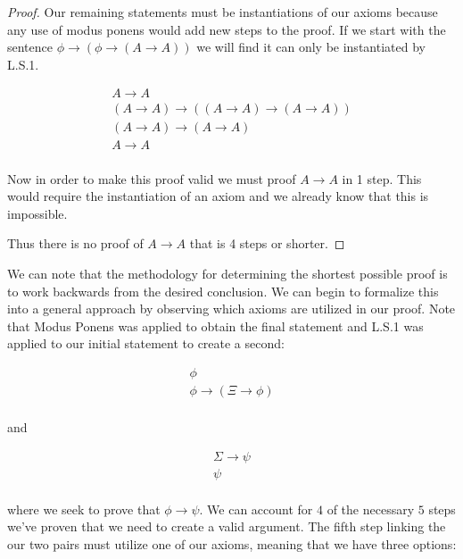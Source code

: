 \documentclass{article}
\begin{document}
\begin{proof}
Our remaining statements must be instantiations of our axioms because any use of modus ponens would add new steps to the proof.
If we start with the sentence $\phi \rightarrow (\phi \rightarrow (A \rightarrow A))$ we will find it can only be instantiated by L.S.1.

\begin{gather*}
A \rightarrow A \\
(A \rightarrow A) \rightarrow ((A \rightarrow A) \rightarrow (A \rightarrow A)) \tag*{L.S.1} \\
(A \rightarrow A) \rightarrow (A \rightarrow A) \tag*{Modus Ponenes} \\
A \rightarrow A \tag*{Modus Ponens}\\
\end{gather*}

Now in order to make this proof valid we must proof $A \rightarrow A$ in 1 step.
This would require the instantiation of an axiom and we already know that this is impossible.

Thus there is no proof of $A \rightarrow A$ that is 4 steps or shorter.
\end{proof}

We can note that the methodology for determining the shortest possible proof is to work backwards from the desired conclusion. We can begin to formalize this into a general approach by observing which axioms are utilized in our proof. Note that Modus Ponens was applied to obtain the final statement and L.S.1 was applied to our initial statement to create a second:

\begin{gather*}
	\phi \tag*{Given (X)} \\
	\phi \rightarrow (\Xi \rightarrow \phi) \tag*{L.P.1 on X (X+1)} \\
\end{gather*}

and 

\begin{gather*}
	\Sigma \rightarrow \psi \tag*{Some axiom (Y-1)} \\
	\psi \tag*{MP on Y-1 (Y)} \\
\end{gather*}

where we seek to prove that $\phi \rightarrow \psi$. We can account for $4$ of the necessary $5$ steps we've proven that we need to create a valid argument. The fifth step linking the our two pairs must utilize one of our axioms, meaning that we have three options: \\
\end{document}
